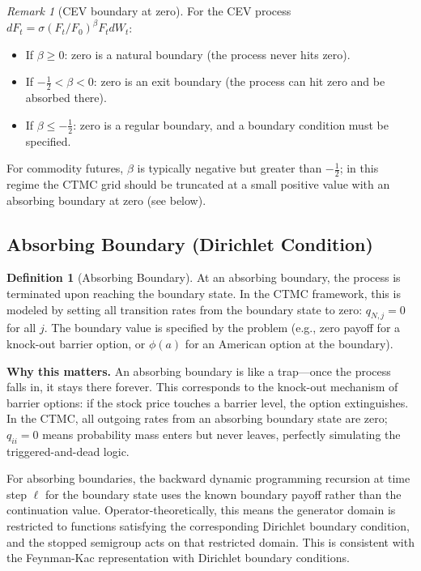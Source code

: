 \documentclass[11pt,a4paper,openany]{book}
\theoremstyle{definition}
\newtheorem{definition}{Definition}[chapter]
\theoremstyle{plain}
\theoremstyle{remark}
\newtheorem{remark}[theorem]{Remark}
\newcommand{\1}{\mathbbm{1}}
\begin{document}
\begin{remark}[CEV boundary at zero]
For the CEV process $dF_{t} = \sigma (F_{t}/F_{0})^{\beta} F_{t} dW_{t}$:
\begin{itemize}
    \item If $\beta \geq 0$: zero is a natural boundary (the process never hits zero).
    \item If $-\frac{1}{2} < \beta < 0$: zero is an exit boundary (the process can hit zero and be absorbed there).
    \item If $\beta \leq -\frac{1}{2}$: zero is a regular boundary, and a boundary condition must be specified.
\end{itemize}
For commodity futures, $\beta$ is typically negative but greater than $-\frac{1}{2}$; in this regime the CTMC grid should be truncated at a small positive value with an absorbing boundary at zero (see below).
\end{remark}

\subsection{Absorbing Boundary (Dirichlet Condition)}

\begin{definition}[Absorbing Boundary]
At an absorbing boundary, the process is terminated upon reaching the boundary state. In the CTMC framework, this is modeled by setting all transition rates from the boundary state to zero: $q_{N,j} = 0$ for all $j$. The boundary value is specified by the problem (e.g., zero payoff for a knock-out barrier option, or $\phi(a)$ for an American option at the boundary).
\end{definition}

\medskip
\noindent\textbf{Why this matters.} An absorbing boundary is like a trap---once the process falls in, it stays there forever. This corresponds to the knock-out mechanism of barrier options: if the stock price touches a barrier level, the option extinguishes. In the CTMC, all outgoing rates from an absorbing boundary state are zero; $q_{ii}=0$ means probability mass enters but never leaves, perfectly simulating the triggered-and-dead logic.

For absorbing boundaries, the backward dynamic programming recursion at time step $\ell$ for the boundary state uses the known boundary payoff rather than the continuation value. Operator-theoretically, this means the generator domain is restricted to functions satisfying the corresponding Dirichlet boundary condition, and the stopped semigroup acts on that restricted domain. This is consistent with the Feynman-Kac representation with Dirichlet boundary conditions.
\end{document}
